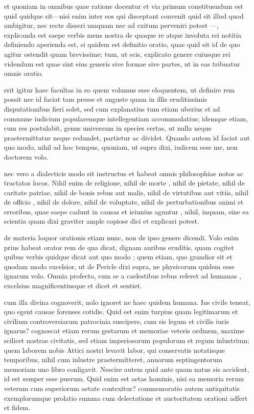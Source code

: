  et quoniam in omnibus quae ratione docentur et via primum constituendum est quid quidque sit—nisi enim inter eos qui disceptant convenit quid sit illud quod ambigitur, nec recte disseri umquam nec ad exitum perveniri potest —, explicanda est saepe verbis mens nostra de quaque re atque involuta rei notitia definiendo aperienda est, si quidem est definitio oratio, quae quid sit id de quo agitur ostendit quam brevissime; tum, ut scis, explicato genere cuiusque rei videndum est quae sint eius generis sive formae sive partes, ut in eas tribuatur omnis oratio.

 erit igitur haec facultas in eo quem volumus esse eloquentem, ut definire rem possit nec id faciat tam presse et anguste quam in illis eruditissimis disputationibus fieri solet, sed cum explanatius tum etiam uberius et ad commune iudicium popularemque intellegentiam accommodatius; idemque etiam, cum res postulabit, genus universum in species certas, ut nulla neque praetermittatur neque redundet, partietur ac dividet. Quando autem id faciat aut quo modo, nihil ad hoc tempus, quoniam, ut supra dixi, iudicem esse me, non doctorem volo.

 nec vero a dialecticis modo sit instructus et habeat omnis philosophiae notos ac tractatos locos. Nihil enim de religione, nihil de morte , nihil de pietate, nihil de caritate patriae, nihil de bonis rebus aut malis, nihil de virtutibus aut vitiis, nihil de officio , nihil de dolore, nihil de voluptate, nihil de perturbationibus animi et erroribus, quae saepe cadunt in causas et ieiunius aguntur , nihil, inquam, sine ea scientia quam dixi graviter ample copiose dici et explicari potest.

 de materia loquor orationis etiam nunc, non de ipso genere dicendi. Volo enim prius habeat orator rem de qua dicat, dignam auribus eruditis, quam cogitet quibus verbis quidque dicat aut quo modo ; quem etiam, quo grandior sit et quodam modo excelsior, ut de Pericle dixi supra, ne physicorum quidem esse ignarum volo. Omnia profecto, cum se a caelestibus rebus referet ad humanas , excelsius magnificentiusque et dicet et sentiet.

 cum illa divina cognoverit, nolo ignoret ne haec quidem humana. Ius civile teneat, quo egent causae forenses cotidie. Quid est enim turpius quam legitimarum et civilium controversiarum patrocinia suscipere, cum sis legum et civilis iuris ignarus? cognoscat etiam rerum gestarum et memoriae veteris ordinem, maxime scilicet nostrae civitatis, sed etiam imperiosorum populorum et regum inlustrium; quem laborem nobis Attici nostri levavit labor, qui conservatis notatisque temporibus, nihil cum inlustre praetermitteret, annorum septingentorum memoriam uno libro conligavit. Nescire autem quid ante quam natus sis accident, id est semper esse puerum. Quid enim est aetas hominis, nisi ea memoria rerum veterum cum superiorum aetate contexitur? commemoratio autem antiquitatis exemplorumque prolatio summa cum delectatione et auctoritatem orationi adfert et fidem.


